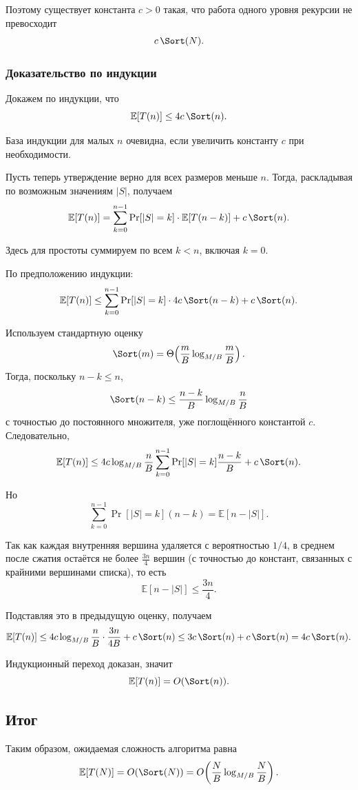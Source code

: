 	Поэтому существует константа $c>0$ такая, что работа одного уровня рекурсии не превосходит
	\[
	c\,\Sort(N).
	\]
	
	\subsubsection*{Доказательство по индукции}
	
	Докажем по индукции, что
	\[
	\mathbb{E}[T(n)] \le 4c\,\Sort(n).
	\]
	
	База индукции для малых $n$ очевидна, если увеличить константу $c$ при необходимости.
	
	Пусть теперь утверждение верно для всех размеров меньше $n$.
	Тогда, раскладывая по возможным значениям $|S|$, получаем
	\[
	\mathbb{E}[T(n)]
	=
	\sum_{k=0}^{n-1}
	\Pr[|S|=k]\cdot \mathbb{E}[T(n-k)]
	+
	c\,\Sort(n).
	\]
	
	Здесь для простоты суммируем по всем $k<n$, включая $k=0$.
	
	По предположению индукции:
	\[
	\mathbb{E}[T(n)]
	\le
	\sum_{k=0}^{n-1}
	\Pr[|S|=k]\cdot 4c\,\Sort(n-k)
	+
	c\,\Sort(n).
	\]
	
	Используем стандартную оценку
	\[
	\Sort(m)=\Theta\!\left(\frac{m}{B}\log_{M/B}\frac{m}{B}\right).
	\]
	Тогда, поскольку $n-k\le n$,
	\[
	\Sort(n-k)
	\le
	\frac{n-k}{B}\log_{M/B}\frac{n}{B}
	\]
	с точностью до постоянного множителя, уже поглощённого константой $c$.
	Следовательно,
	\[
	\mathbb{E}[T(n)]
	\le
	4c\log_{M/B}\frac{n}{B}
	\sum_{k=0}^{n-1}\Pr[|S|=k]\frac{n-k}{B}
	+
	c\,\Sort(n).
	\]
	
	Но
	\[
	\sum_{k=0}^{n-1}\Pr[|S|=k](n-k)
	=
	\mathbb{E}[n-|S|].
	\]
	
	Так как каждая внутренняя вершина удаляется с вероятностью $1/4$, в среднем после сжатия остаётся не более $\frac{3n}{4}$ вершин
	(с точностью до констант, связанных с крайними вершинами списка), то есть
	\[
	\mathbb{E}[n-|S|]\le \frac{3n}{4}.
	\]
	
	Подставляя это в предыдущую оценку, получаем
	\[
	\mathbb{E}[T(n)]
	\le
	4c\log_{M/B}\frac{n}{B}\cdot \frac{3n}{4B}
	+
	c\,\Sort(n)
	\le
	3c\,\Sort(n)+c\,\Sort(n)
	=
	4c\,\Sort(n).
	\]
	
	Индукционный переход доказан, значит
	\[
	\mathbb{E}[T(n)] = O(\Sort(n)).
	\]
	
	\subsection*{Итог}
	
	Таким образом, ожидаемая сложность алгоритма равна
	\[
	\mathbb{E}[T(N)] = O(\Sort(N))
	=
	O\!\left(
	\frac{N}{B}\log_{M/B}\frac{N}{B}
	\right).
	\]
	
